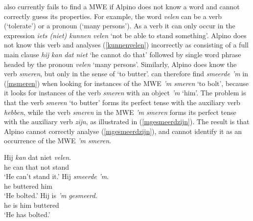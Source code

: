 \documentclass[output=paper,colorlinks,citecolor=brown]{langscibook}
\begin{document}
{\mwefinder} also currently fails to find a MWE  if Alpino does not know a word and cannot correctly guess its properties. For example, the word \textit{velen} can be a verb (`tolerate') or a pronoun (`many persons'). As a  verb it can only occur in the expression \textit{iets (niet) kunnen velen} `not be able to stand something'. Alpino does not know this verb and analyses (\ref{kunnenvelen}) incorrectly as consisting of a full main clause \textit{hij kan dat niet} `he cannot do that' followed by single word phrase headed by the pronoun \textit{velen} `many persons'. Similarly, Alpino does know the verb \textit{smeren}, but only in the sense of `to butter'. {\mwefinder} can therefore find \textit{smeerde 'm} in (\ref{msmeren}) when looking for instances of the MWE \textit{'m smeren} `to bolt', because it looks for instances of the verb \textit{smeren} with an object \textit{'m} `him'. The problem is that the verb \textit{smeren} `to butter' forms its perfect tense with the auxiliary verb \textit{hebben}, while the verb \textit{smeren} in the MWE \textit{'m smeren} forms its perfect tense with the auxiliary verb \textit{zijn}, as illustrated in  (\ref{mgesmeerdzijn}). The result is that Alpino cannot correctly analyse (\ref{mgesmeerdzijn}), and {\mwefinder} cannot identify it as an occurrence of the MWE \textit{'m smeren}.


\begin{exe}
\ex \gll Hij \textit{kan} dat niet \textit{velen}.\\
he can that not stand\\ \label{kunnenvelen}
\glt `He can't stand it.'
\ex \gll Hij \textit{smeerde} \textit{'m}.\\ 
he buttered him\\ \label{msmeren}
\glt `He bolted.'
\ex \gll Hij is \textit{'m} \textit{gesmeerd}.\\
he is him buttered\\ \label{mgesmeerdzijn}
\glt `He has bolted.'
\end{exe}
\end{document}
